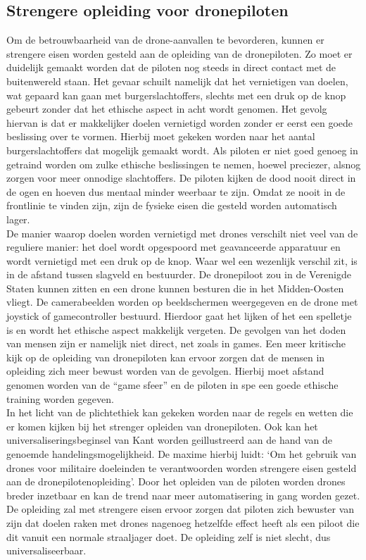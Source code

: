\subsection{Strengere opleiding voor dronepiloten}
\subtitle{David Veselka}
\label{chapter:beter_opleiden}
Om de betrouwbaarheid van de drone-aanvallen te bevorderen, kunnen er strengere eisen worden gesteld aan de opleiding van de dronepiloten. Zo moet er duidelijk gemaakt worden dat de piloten nog steeds in direct contact met de buitenwereld staan. Het gevaar schuilt namelijk dat het vernietigen van doelen, wat gepaard kan gaan met burgerslachtoffers, slechts met een druk op de knop gebeurt zonder dat het ethische aspect in acht wordt genomen. Het gevolg hiervan is dat er makkelijker doelen vernietigd worden zonder er eerst een goede beslissing over te vormen. Hierbij moet gekeken worden naar het aantal burgerslachtoffers dat mogelijk gemaakt wordt. Als piloten er niet goed genoeg in getraind worden om zulke ethische beslissingen te nemen, hoewel preciezer, alsnog zorgen voor meer onnodige slachtoffers. De piloten kijken de dood nooit direct in de ogen en hoeven dus mentaal minder weerbaar te zijn. Omdat ze nooit in de frontlinie te vinden zijn, zijn de fysieke eisen die gesteld worden automatisch lager.\\

De manier waarop doelen worden vernietigd met drones verschilt niet veel van de reguliere manier: het doel wordt opgespoord met geavanceerde apparatuur en wordt vernietigd met een druk op de knop. Waar wel een wezenlijk verschil zit, is in de afstand tussen slagveld en bestuurder. De dronepiloot zou in de Verenigde Staten kunnen zitten en een drone kunnen besturen die in het Midden-Oosten vliegt. De camerabeelden worden op beeldschermen weergegeven en de drone met joystick of gamecontroller bestuurd. Hierdoor gaat het lijken of het een spelletje is en wordt het ethische aspect makkelijk vergeten. De gevolgen van het doden van mensen zijn er namelijk niet direct, net zoals in games. Een meer kritische kijk op de opleiding van dronepiloten kan ervoor zorgen dat de mensen in opleiding zich meer bewust worden van de gevolgen. Hierbij moet afstand genomen worden van de ``game sfeer'' en de piloten in spe een goede ethische training worden gegeven.\\

In het licht van de plichtethiek kan gekeken worden naar de regels en wetten die er komen kijken bij het strenger opleiden van dronepiloten. Ook kan het universaliseringsbeginsel van Kant worden geillustreerd aan de hand van de genoemde handelingsmogelijkheid. De maxime hierbij luidt: `Om het gebruik van drones voor militaire doeleinden te verantwoorden worden strengere eisen gesteld aan de dronepilotenopleiding'. Door het opleiden van de piloten worden drones breder inzetbaar en kan de trend naar meer automatisering in gang worden gezet. De opleiding zal met strengere eisen ervoor zorgen dat piloten zich bewuster van zijn dat doelen raken met drones nagenoeg hetzelfde effect heeft als een piloot die dit vanuit een normale straaljager doet. De opleiding zelf is niet slecht, dus universaliseerbaar.\\

